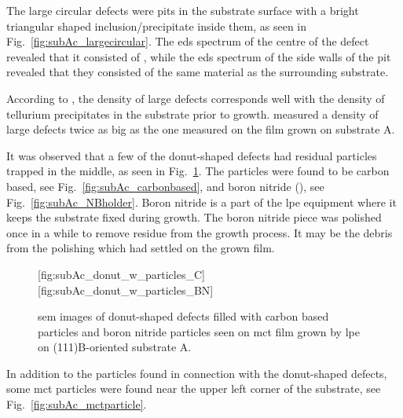 The large circular defects were pits in the substrate surface with a bright triangular shaped inclusion/precipitate inside them, as seen in Fig.~\ref{fig:subAc_largecircular}. The \ac{eds} spectrum of the centre of the defect revealed that it consisted of , while the \ac{eds} spectrum of the side walls of the pit revealed that they consisted of the same material as the surrounding substrate. 

According to \citet{pelliciari1994te}, the density of large defects corresponds well with the density of tellurium precipitates in the substrate prior to growth. \citet{pelliciari1994te} measured a density of large defects twice as big as the one measured on the film grown on substrate A.

It was observed that a few of the donut-shaped defects had residual particles trapped in the middle, as seen in Fig.~\ref{fig:subAc_donut_w_particles}. The particles were found to be carbon based, see Fig.~\ref{fig:subAc_carbonbased}, and boron nitride (), see Fig.~\ref{fig:subAc_NBholder}. Boron nitride is a part of the \ac{lpe} equipment where it keeps the substrate fixed during growth. The boron nitride piece was polished once in a while to remove residue from the growth process. It may be the debris from the polishing which had settled on the grown film.

\begin{figure}[htbp]
    \centering
    [fig:subAc_donut_w_particles_C]
    \hfill
    [fig:subAc_donut_w_particles_BN]
    \caption[\Ac{sem} images of donut-shaped defects filled with carbon based particles and boron nitride particles.]{\Ac{sem} images of donut-shaped defects filled with  carbon based particles and  boron nitride particles seen on \ac{mct} film grown by \ac{lpe} on (111)B-oriented substrate A.}
    \label{fig:subAc_donut_w_particles}
\end{figure}

In addition to the particles found in connection with the donut-shaped defects, some \ac{mct} particles were found near the upper left corner of the substrate, see Fig.~\ref{fig:subAc_mctparticle}.

